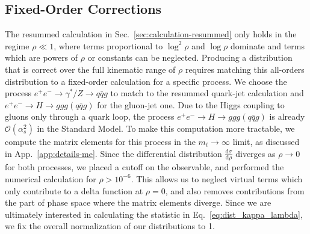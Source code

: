 \documentclass[letterpaper,11pt]{article}
\newcommand{\Sec}[1]{Sec.~\ref{#1}}
\newcommand{\App}[1]{App.~\ref{#1}}
\newcommand{\Eq}[1]{Eq.~\eqref{#1}}
\begin{document}

\subsection{Fixed-Order Corrections}
\label{sec:calculation-matching-fo}


The resummed calculation in \Sec{sec:calculation-resummed} only holds in the regime $\rho \ll 1$, where terms proportional to $\log^2\rho$ and $\log\rho$ dominate and terms which are powers of $\rho$ or constants can be neglected. 
%
Producing a distribution that is correct over the full kinematic range of $\rho$ requires matching this all-orders distribution to a fixed-order calculation for a specific process. 
%
We choose the process $e^+e^-\rightarrow \gamma^*/Z \rightarrow q\bar{q}g$ to match to the resummed quark-jet calculation and $e^+e^-\rightarrow H \rightarrow ggg (q\bar{q}g)$ for the gluon-jet one. 
%
Due to the Higgs coupling to gluons only through a quark loop, the process $e^+e^-\rightarrow H \rightarrow ggg (q\bar{q}g)$ is already $\mathcal{O}(\alpha_s^2)$ in the Standard Model. 
%
To make this computation more tractable, we compute the matrix elements for this process in the $m_t\rightarrow \infty$ limit, as discussed in \App{app:details-me}.
%
Since the differential distribution $\frac{\text{d}\sigma}{\text{d}\rho}$ diverges as $\rho \rightarrow 0$ for both processes, we placed a cutoff on the observable, and performed the numerical calculation for $\rho > 10^{-6}$. 
%
This allows us to neglect virtual terms which only contribute to a delta function at $\rho = 0$, and also removes contributions from the part of phase space where the matrix elements diverge.
%
Since we are ultimately interested in calculating the statistic in \Eq{eq:dist_kappa_lambda}, we fix the overall normalization of our distributions to 1.
\end{document}
